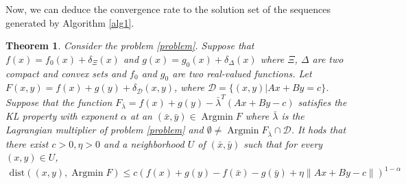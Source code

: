 \documentclass{article}
\numberwithin{equation}{section}
\newtheorem{theorem}{Theorem}[section]
\def\Argmin{\mathop{\mathrm{Argmin}}}
\begin{document}
Now, we can deduce the convergence rate to the solution set of the sequences generated by Algorithm \ref{alg1}. 
\begin{theorem} \label{Theorem_of_KL}
    Consider the problem \eqref{problem}. Suppose that $f(x) = f_0(x) + \delta_{\Xi}(x)$ and $g(x) = g_0(x) + \delta_{\Delta}(x)$ where 
    $\Xi$, $\Delta$ are two compact and convex sets and $f_0$ and $g_0$ are two real-valued functions.     
    Let $F(x,y)= f(x)+ g(y)+ \delta_{\mathcal{D}}(x,y)$, where $\mathcal{D} = \{(x,y)| Ax+By=c\}$. Suppose that the function $F_{\bar{\lambda}} = f(x) + g(y)- \bar{\lambda}^T(Ax+By-c)$ 
    satisfies the KL property with exponent $\alpha$ at an $(\bar{x},\bar{y}) \in \Argmin F$ where $\bar{\lambda}$ is the Lagrangian multiplier of problem \eqref{problem}  
    and $\emptyset \neq \Argmin F_{\bar{\lambda}}\cap \mathcal{D}$. It hods that there exist $c>0,\eta>0$ and
    a neighborhood $U$ of $(\bar{x}, \bar{y})$ such that for every $(x,y)\in U$,  
    \begin{align} 
        \mathrm{dist}\left((x,y), \Argmin F\right) \leq c\left(f(x) + g(y)-f(\bar{x})-g(\bar{y})+\eta\|Ax+By-c\rVert\right)^{1-\alpha} \nonumber
    \end{align} 
\end{theorem}
\end{document}
